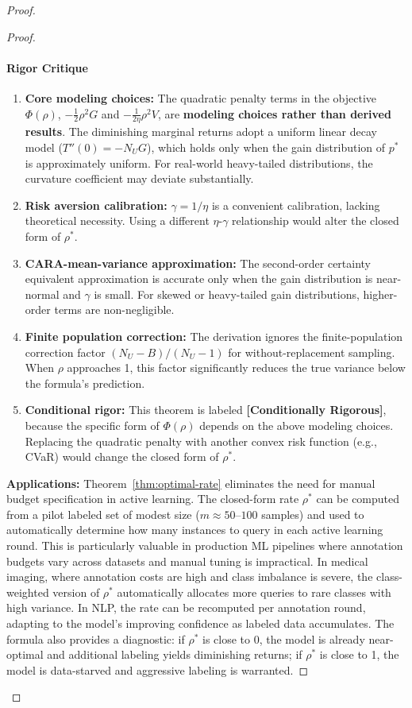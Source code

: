 \documentclass[12pt,a4paper]{article}
\newcommand{\conditionallyrigorous}{\textbf{[Conditionally Rigorous]}}
\newenvironment{critique}{\paragraph{Rigor Critique}\quad}{\par}
\begin{document}
\begin{proof}
\begin{proof}
\begin{critique}
\begin{enumerate}
    \item \textbf{Core modeling choices:} The quadratic penalty terms in the objective $\Phi(\rho)$,
    $-\tfrac12\rho^2 G$ and $-\tfrac1{2\eta}\rho^2 V$, are \textbf{modeling choices rather than derived results}.
    The diminishing marginal returns adopt a uniform linear decay model ($T''(0)=-N_U G$), which holds only when the gain distribution of $p^*$ is approximately uniform. For real-world heavy-tailed distributions, the curvature coefficient may deviate substantially.
    \item \textbf{Risk aversion calibration:} $\gamma=1/\eta$ is a convenient calibration,
    lacking theoretical necessity. Using a different $\eta$-$\gamma$ relationship would alter the closed form of $\rho^*$.
    \item \textbf{CARA-mean-variance approximation:} The second-order certainty equivalent approximation is accurate only when the gain distribution is near-normal and $\gamma$ is small. For skewed or heavy-tailed gain distributions, higher-order terms are non-negligible.
    \item \textbf{Finite population correction:} The derivation ignores the finite-population correction factor
    $(N_U-B)/(N_U-1)$ for without-replacement sampling. When $\rho$ approaches 1, this factor significantly reduces the true variance below the formula's prediction.
    \item \textbf{Conditional rigor:} This theorem is labeled \conditionallyrigorous,
    because the specific form of $\Phi(\rho)$ depends on the above modeling choices. Replacing the quadratic penalty with another convex risk function (e.g., CVaR) would change the closed form of $\rho^*$.
\end{enumerate}
\end{critique}

\medskip\noindent
\textbf{Applications:}
Theorem~\ref{thm:optimal-rate} eliminates the need for manual budget
specification in active learning.  The closed-form rate $\rho^*$ can be
computed from a pilot labeled set of modest size ($m\approx 50$--$100$ samples)
and used to automatically determine how many instances to query in each
active learning round.  This is particularly valuable in production ML pipelines
where annotation budgets vary across datasets and manual tuning is impractical.
In medical imaging, where annotation costs are high and class imbalance is
severe, the class-weighted version of $\rho^*$ automatically allocates more
queries to rare classes with high variance.  In NLP, the rate can be
recomputed per annotation round, adapting to the model's improving confidence
as labeled data accumulates.  The formula also provides a diagnostic: if
$\rho^*$ is close to 0, the model is already near-optimal and additional
labeling yields diminishing returns; if $\rho^*$ is close to 1, the model
is data-starved and aggressive labeling is warranted.


\end{proof}
\end{proof}
\end{document}
